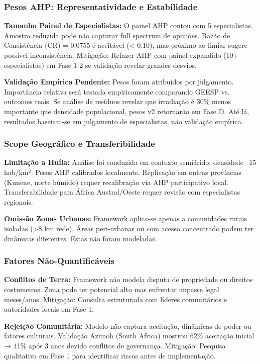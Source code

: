 \documentclass[12pt, a4paper]{article}
\begin{document}
{{{{{{{{{{{{\subsubsection{Pesos AHP: Representatividade e Estabilidade}

\textbf{Tamanho Painel de Especialistas:} O painel AHP contou com 5 especialistas. Amostra reduzida pode não capturar full spectrum de opiniões. Razão de Consistência (CR) = 0.0755 é aceitável (< 0.10), mas próximo ao limiar sugere possível inconsistência. Mitigação: Refazer AHP com painel expandido (10+ especialistas) em Fase 1-2 se validação revelar grandes desvios.

\textbf{Validação Empírica Pendente:} Pesos foram atribuídos por julgamento. Importância relativa será testada empiricamente comparando GEESP vs. outcomes reais. Se análise de resíduos revelar que irradiação é 30\% menos importante que densidade populacional, pesos v2 retornarão em Fase D. Até lá, resultados baseiam-se em julgamento de especialistas, não validação empírica.

\subsubsection{Scope Geográfico e Transferibilidade}

\textbf{Limitação a Huíla:} Análise foi conduzida em contexto semiárido, densidade ~15 hab/km². Pesos AHP calibrados localmente. Replicação em outras províncias (Kunene, norte húmido) requer recalibração via AHP participativo local. Transferabilidade para África Austral/Oeste requer revisão com especialistas regionais.

\textbf{Omissão Zonas Urbanas:} Framework aplica-se apenas a comunidades rurais isoladas (>8 km rede). Áreas peri-urbanas ou com acesso concentrado podem ter dinâmicas diferentes. Estas não foram modeladas.

\subsubsection{Fatores Não-Quantificáveis}

\textbf{Conflitos de Terra:} Framework não modela disputa de propriedade ou direitos costumeiros. Zona pode ter potencial alto mas enfrentar impasse legal meses/anos. Mitigação: Consulta estruturada com líderes comunitários e autoridades locais em Fase 1.

\textbf{Rejeição Comunitária:} Modelo não captura aceitação, dinâmicas de poder ou fatores culturais. Validação Azimoh (South Africa) mostrou 62\% aceitação inicial → 41\% após 3 anos devido conflitos de governança. Mitigação: Pesquisa qualitativa em Fase 1 para identificar riscos antes de implementação.

}}}}}}}}}}}}
\end{document}
